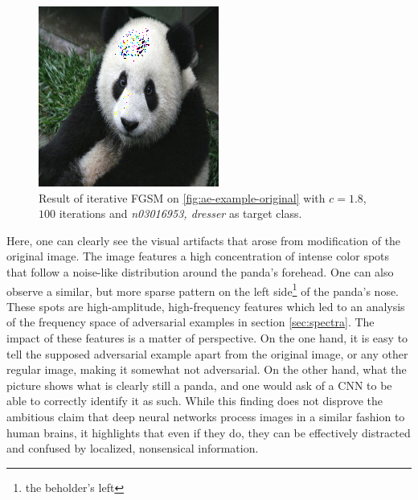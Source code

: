 \documentclass[11pt, a4paper]{article}
\begin{document}
\begin{figure}[h!tb]
	\centering
	\includegraphics[scale=0.90]{images/aes/panda_dresser_100_1dot8.png}
	\caption[Flawed adversarial example obtained with high adpation strength]{Result of iterative FGSM on \ref{fig:ae-example-original} with $c = 1.8$, $100$ iterations and \emph{n03016953, dresser} as target class.}
	\label{fig:ae-panda-dresser-1dot8}
\end{figure}

Here, one can clearly see the visual artifacts that arose from modification of the original image. The image features a high concentration of intense color spots that follow a noise-like distribution around the panda's forehead. One can also observe a similar, but more sparse pattern on the left side\footnote{the beholder's left} of the panda's nose. These spots are high-amplitude, high-frequency features which led to an analysis of the frequency space of adversarial examples in section \ref{sec:spectra}. The impact of these features is a matter of perspective. On the one hand, it is easy to tell the supposed adversarial example apart from the original image, or any other regular image, making it somewhat not adversarial. On the other hand, what the picture shows what is clearly still a panda, and one would ask of a CNN to be able to correctly identify it as such. While this finding does not disprove the ambitious claim that deep neural networks process images in a similar fashion to human brains, it highlights that even if they do, they can be effectively distracted and confused by localized, nonsensical information.
\end{document}
